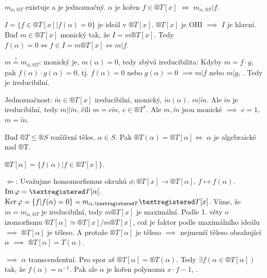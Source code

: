 \documentclass[12pt]{article}                   %
\begin{document}
        \begin{tvrzeni}
            $m_{\alpha, ®T}$ existuje a je jednoznačný. $\alpha$ je kořen $f \in ®T[x]$ $\Leftrightarrow$ $m_{\alpha, ®T} | f$.

            \begin{dukazin}
                $I = \{f \in ®T[x] | f(\alpha) = 0\}$ je ideál v $®T[x]$. $®T[x]$ je OHI $\implies$ $I$ je hlavní. Buď $m \in ®T[x]$ monický tak, že $I = m®T[x]$. Tedy $f(\alpha) = 0 \Leftrightarrow f \in I = m®T[x] \Leftrightarrow m|f$.

                $m \overset{?}{=} m_{\alpha, ®T}$: monický je, $m(\alpha) = 0$, tedy zbývá ireducibilita: Kdyby $m = f·g$, pak $f(\alpha)·g(\alpha) = 0$, tj. $f(\alpha) = 0$ nebo $g(\alpha) = 0$ $\implies m | f$ nebo $m|g$, \lightning. Tedy je ireducibilní.

                Jednoznačnost: $\tilde{m} \in ®T[x]$ ireducibilní, monický, $\tilde{m}(\alpha)$. $m | \tilde{m}$. Ale $\tilde{m}$ je ireducibilní, tedy $m||\tilde{m}$, čili $m = c\tilde{m}$, $c \in ®T^*$. Ale $m, \tilde{m}$ jsou monické $\implies$ $c = 1$, $m = \tilde{m}$.
            \end{dukazin}
        \end{tvrzeni}

        \begin{tvrzeni}
            Buď $®T ≤ ®S$ rozšíření těles, $\alpha \in S$. Pak $®T(\alpha) = ®T[\alpha] \Leftrightarrow$ $\alpha$ je algebraické nad ®T.

            \begin{dukazin}
                $®T[\alpha] = \{f(\alpha) | f \in ®T[x]\}$.

                $\Leftarrow$: Uvažujme homomorfismus okruhů $\phi: ®T[x] \rightarrow ®T[\alpha]$, $f \mapsto f(\alpha)$. $\im \phi = ®T[\alpha]$. $\Ker \phi = \{f | f(\alpha) = 0\} = m_{\alpha, ®T}®T[x]$. Víme, že $m = m_{\alpha, ®T}$ je ireducibilní, tedy $m®T[x]$ je maximální. Podle 1. věty o izomorfismu $®T[\alpha] \simeq ®T[x] / m®T[x]$, což je faktor podle maximálního ideálu $\implies$ $®T[\alpha]$ je těleso. A protože $®T[\alpha]$ je těleso $\implies$ nejmenší těleso obsahující $\alpha$ $\implies$ $®T[\alpha] = T(\alpha)$.

                $\implies$ $\alpha$ transcendentní. Pro spor ať $®T[\alpha] = ®T(\alpha)$. Tedy $\exists f(\alpha \in ®T[\alpha])$ tak, že $f(\alpha) = \alpha^{-1}$. Pak ale $\alpha$ je kořen polynomu $x·f - 1$, \lightning.
            \end{dukazin}
        \end{tvrzeni}
\end{document}
